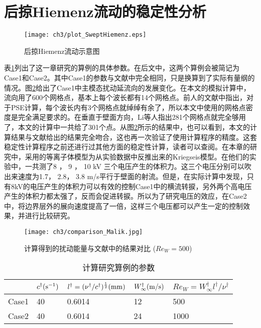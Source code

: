 \section{后掠Hiemenz流动的稳定性分析}
\begin{figure}[htb]
  \centering
  \texttt{[image: ch3/plot\_SweptHiemenz.eps]}\\
  \caption{后掠Hiemenz流动示意图}\label{fig:SweptHiemenz}
\end{figure}
表\ref{t:testcase}列出了这一章研究的算例的具体参数。在后文中，这两个算例会被简记为Case1和Case2。其中Case1的参数与文献\cite{Malik1994}中完全相同，只是换算到了实际有量纲的情况。图\ref{f:Com_Malik1994}给出了Case1中主模态扰动延流向的发展变化。在本文的模拟计算中，流向用了600个网格点，基本上每个波长都有14个网格点。前人的文献中指出，对于PSE计算，每个波长内有3个网格点就绰绰有余了\cite{Joslin1992}，所以本文中使用的网格点密度是完全满足要求的。在垂直于壁面方向，Li等人\cite{Li2015a}指出281个网格点就完全够用了，本文的计算中一共给了301个点。从图\ref{f:Com_Malik1994}所示的结果中，也可以看到，本文的计算结果与文献给出的结果完全吻合，这也再一次验证了使用计算程序的精度。这套稳定性计算程序之前还进行过其他方面的稳定性计算，读者可以查阅\cite{Xu2011a,Xu2011b,Ren2014a,Ren2014b,Ren2014c,Ren2015,Ren2016}。在本章的研究中，采用的等离子体模型为从实验数据中反推出来的Kriegseis模型\cite{kriegseis2013velocity}。在他们的实验中，一共测了8 ， 9 ， 10 kV 三个电压产生的体积力。这三个电压分别可以吹出来速度为1.7， 2.8， 3.8 m/s平行于壁面的射流。但是，在实际计算中发现，只有8kV的电压产生的体积力可以有效的控制Case1中的横流转捩，另外两个高电压产生的体积力都太强了，反而会促进转捩。所以为了研究电压的效应，在Case2中，将边界层外的展向速度提高了一倍，这样三个电压都可以产生一定的控制效果，并进行比较研究。
\begin{figure}[htb]
  \centering
  \texttt{[image: ch3/comparison\_Malik.jpg]}\\
  \caption{计算得到的扰动能量与文献\cite{Malik1994}中的结果对比 ($Re_W=500$)}\label{f:Com_Malik1994}
\end{figure}
\begin{table}
  \caption{计算研究算例的参数}\label{t:testcase}
  \centering
  \begin{tabular}{p{2.3cm}<{\centering}p{2.5cm}<{\centering}p{3.5cm}<{\centering}p{2.5cm}<{\centering}p{3.5cm}<{\centering}}%
  \toprule[1.5pt]
        & $c^{\dagger}{\rm (s^{-1})}$ & $l^\dagger=(\nu^{\dagger}/c^{\dagger})^{\frac{1}{2}} ({\rm mm})$ & $W_\infty^{\dagger}{\rm (m/s)}$ & $Re_W=W_\infty^{\dagger} l^\dagger/\nu^{\dagger}$ \\
  \midrule[1pt]
  Case1 & 40          & 0.6014            & 12              & 500 \\
  Case2 & 40          & 0.6014            & 24              & 1000 \\
  \bottomrule[1.5pt]
  \end{tabular}

\end{table}

